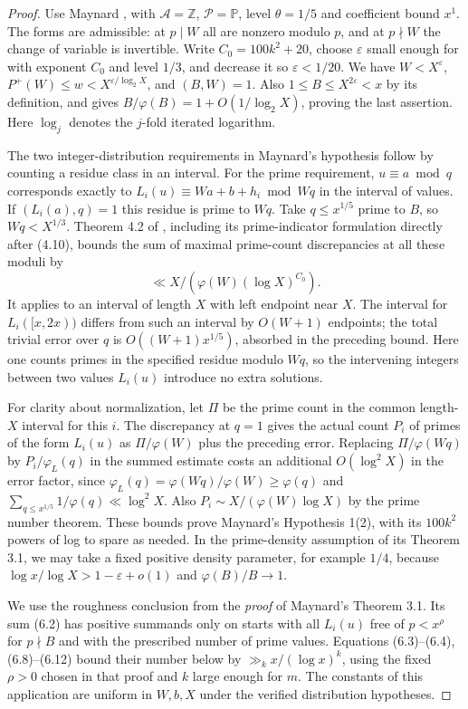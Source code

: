 \documentclass[10pt]{article}
\newcommand{\PP}{\mathbb P}
\newcommand{\ph}{\varphi}
\newcommand{\eps}{\varepsilon}
\newcommand{\Z}{\mathbb Z}
\begin{document}
\begin{proof}
Use Maynard \cite[Hypothesis 1 and the proof of Theorem 3.1]{May}, with $\mathcal A=\Z$, $\mathcal P=\PP$, level $\theta=1/5$ and coefficient bound $x^1$. The forms are admissible: at $p\mid W$ all are nonzero modulo $p$, and at $p\nmid W$ the change of variable is invertible. Write $C_0=100k^2+20$, choose $\eps$ small enough for \cite[Theorem 4.2]{BFM} with exponent $C_0$ and level $1/3$, and decrease it so $\eps<1/20$. We have $W<X^\eps$, $P^+(W)\le w<X^{\eps/\log_2 X}$, and $(B,W)=1$. Also $1\le B\le X^{2\eps}<x$ by its definition, and \cite[(4.9)]{BFM} gives $B/\ph(B)=1+O(1/\log_2 X)$, proving the last assertion. Here $\log_j$ denotes the $j$-fold iterated logarithm.

The two integer-distribution requirements in Maynard's hypothesis follow by counting a residue class in an interval. For the prime requirement, $u\equiv a\bmod q$ corresponds exactly to $L_i(u)\equiv Wa+b+h_i\bmod Wq$ in the interval of values. If $(L_i(a),q)=1$ this residue is prime to $Wq$. Take $q\le x^{1/5}$ prime to $B$, so $Wq<X^{1/3}$. Theorem 4.2 of \cite{BFM}, including its prime-indicator formulation directly after (4.10), bounds the sum of maximal prime-count discrepancies at all these moduli by
\[
 \ll X/(\ph(W)(\log X)^{C_0}).
\]
It applies to an interval of length $X$ with left endpoint near $X$. The interval for $L_i([x,2x))$ differs from such an interval by $O(W+1)$ endpoints; the total trivial error over $q$ is $O((W+1)x^{1/5})$, absorbed in the preceding bound. Here one counts primes in the specified residue modulo $Wq$, so the intervening integers between two values $L_i(u)$ introduce no extra solutions.

For clarity about normalization, let $\Pi$ be the prime count in the common length-$X$ interval for this $i$. The discrepancy at $q=1$ gives the actual count $P_i$ of primes of the form $L_i(u)$ as $\Pi/\ph(W)$ plus the preceding error. Replacing $\Pi/\ph(Wq)$ by $P_i/\ph_L(q)$ in the summed estimate costs an additional $O(\log^2 X)$ in the error factor, since $\ph_L(q)=\ph(Wq)/\ph(W)\ge\ph(q)$ and $\sum_{q\le x^{1/5}}1/\ph(q)\ll\log^2 X$. Also $P_i\sim X/(\ph(W)\log X)$ by the prime number theorem. These bounds prove Maynard's Hypothesis 1(2), with its $100k^2$ powers of log to spare as needed. In the prime-density assumption of its Theorem 3.1, we may take a fixed positive density parameter, for example $1/4$, because $\log x/\log X>1-\eps+o(1)$ and $\ph(B)/B\to1$.

We use the roughness conclusion from the \emph{proof} of Maynard's Theorem 3.1. Its sum (6.2) has positive summands only on starts with all $L_i(u)$ free of $p<x^\rho$ for $p\nmid B$ and with the prescribed number of prime values. Equations (6.3)--(6.4), (6.8)--(6.12) bound their number below by $\gg_k x/(\log x)^k$, using the fixed $\rho>0$ chosen in that proof and $k$ large enough for $m$. The constants of this application are uniform in $W,b,X$ under the verified distribution hypotheses.
\end{proof}
\end{document}
